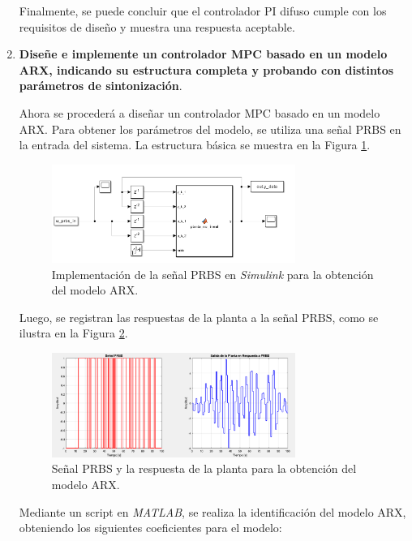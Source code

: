\begin{enumerate}
    Finalmente, se puede concluir que el controlador PI difuso cumple con los requisitos de diseño y muestra una respuesta aceptable.
    \newpage
    \item \textbf{Diseñe e implemente un controlador MPC basado en un modelo ARX, indicando su estructura completa y probando con distintos parámetros de sintonización}. 
    
    Ahora se procederá a diseñar un controlador MPC basado en un modelo ARX. Para obtener los parámetros del modelo, se utiliza una señal PRBS en la entrada del sistema. La estructura básica se muestra en la Figura \ref{fig:9}.
    
    \begin{figure}
        \centering
        \includegraphics[width=0.75\textwidth]{img/Figure_10}
        \caption{Implementación de la señal PRBS en \textit{Simulink} para la obtención del modelo ARX.}
        \label{fig:9}
    \end{figure}
    
    Luego, se registran las respuestas de la planta a la señal PRBS, como se ilustra en la Figura \ref{fig:10}.
    
    \begin{figure}
        \centering
        \includegraphics[width=0.75\textwidth]{img/Figure_9}
        \caption{Señal PRBS y la respuesta de la planta para la obtención del modelo ARX.}
        \label{fig:10}
    \end{figure}
    
    Mediante un script en \textit{MATLAB}, se realiza la identificación del modelo ARX, obteniendo los siguientes coeficientes para el modelo:
    

\end{enumerate}
